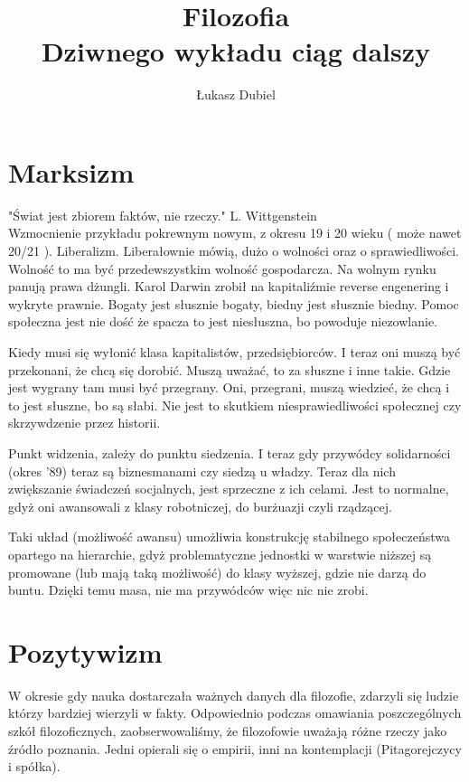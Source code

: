 \documentclass[11pt]{article}
\author{Łukasz Dubiel}
\title{Filozofia \\ Dziwnego wykładu ciąg dalszy}
\begin{document}
\maketitle

\section{Marksizm}

"Świat jest zbiorem faktów, nie rzeczy." L. Wittgenstein
\\

Wzmocnienie przykładu pokrewnym nowym, z okresu 19 i 20 wieku ( może nawet 20/21 ). Liberalizm. Liberałownie mówią, dużo o wolności oraz o sprawiedliwości. Wolność to ma być przedewszystkim wolność gospodarcza. Na wolnym rynku panują prawa dżungli. Karol Darwin zrobił na kapitaliźmie reverse engenering i wykryte prawnie.
Bogaty jest słusznie bogaty, biedny jest słusznie biedny. Pomoc społeczna jest nie dość że spacza to jest niesłuszna, bo powoduje niezowlanie.

Kiedy musi się wyłonić klasa kapitalistów, przedsiębiorców. I teraz oni muszą być przekonani, że chcą się dorobić. Muszą uważać, to za słuszne i inne takie. Gdzie jest wygrany tam musi być przegrany. Oni, przegrani, muszą wiedzieć, że chcą i to jest słuszne, bo są słabi. Nie jest to skutkiem niesprawiedliwości społecznej czy skrzywdzenie przez historii. 

Punkt widzenia, zależy do punktu siedzenia. I teraz gdy przywódcy solidarności (okres '89) teraz są biznesmanami czy siedzą u władzy. Teraz dla nich zwiększanie świadczeń socjalnych, jest sprzeczne z ich celami. Jest to normalne, gdyż oni awansowali z klasy robotniczej, do burżuazji czyli rządzącej.

Taki układ (możliwość awansu) umożliwia konstrukcję stabilnego społeczeństwa opartego na hierarchie, gdyż problematyczne jednostki w warstwie niższej są promowane (lub mają taką możliwość) do klasy wyższej, gdzie nie darzą do buntu. Dzięki temu masa, nie ma przywódców więc nic nie zrobi.

\section{Pozytywizm}

W okresie gdy nauka dostarczała ważnych danych dla filozofie, zdarzyli się ludzie którzy bardziej wierzyli w fakty. Odpowiednio podczas omawiania poszczególnych szkół filozoficznych, zaobserwowaliśmy, że filozofowie uważają różne rzeczy jako źródło poznania. Jedni opierali się o empirii, inni na kontemplacji (Pitagorejczycy i spółka).
\end{document}
